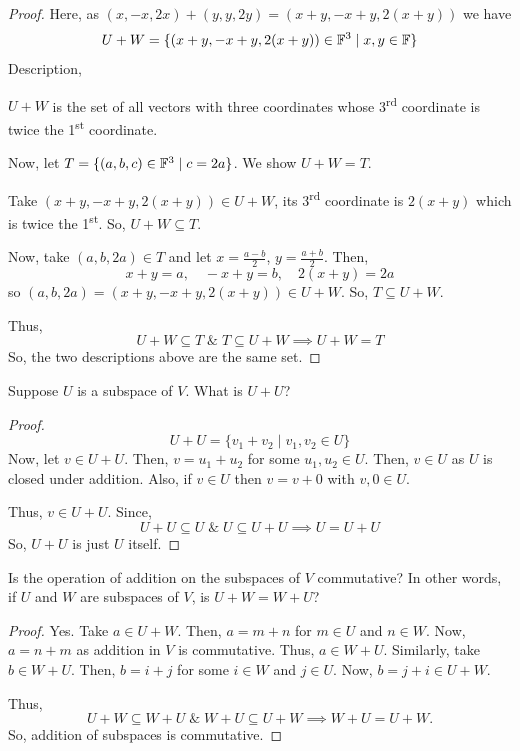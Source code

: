 \begin{proof}
Here, as $(x,-x,2x) + (y,y,2y) = (x+y, -x+y, 2(x+y))$ we have
\[
U + W = \{(x+y, -x+y, 2(x+y)) \in \mathbb{F}^3 \mid x, y \in \mathbb{F}\}
\]
Description,

$U + W$ is the set of all vectors with three coordinates whose 3\textsuperscript{rd} coordinate is twice the 1\textsuperscript{st} coordinate.

Now, let $T = \{(a,b,c) \in \mathbb{F}^3 \mid c = 2a\}$. We show $U + W = T$.

Take $(x+y, -x+y, 2(x+y)) \in U + W$, its 3\textsuperscript{rd} coordinate is $2(x+y)$ which is twice the 1\textsuperscript{st}. So, $U + W \subseteq T$.

Now, take $(a,b,2a) \in T$ and let $x = \frac{a-b}{2}$, $y = \frac{a+b}{2}$. Then,
\[
x + y = a, \quad -x + y = b, \quad 2(x+y) = 2a
\]
so $(a,b,2a) = (x+y, -x+y, 2(x+y)) \in U + W$. So, $T \subseteq U + W$.

Thus,
\[
U + W \subseteq T \;\&\; T \subseteq U + W \implies U + W = T
\]
So, the two descriptions above are the same set.
\end{proof}

\begin{exercise}
Suppose $U$ is a subspace of $V$. What is $U + U$?
\end{exercise}

\begin{proof}
\[
U + U = \{v_1 + v_2 \mid v_1, v_2 \in U\}
\]
Now, let $v \in U + U$. Then, $v = u_1 + u_2$ for some $u_1, u_2 \in U$. Then, $v \in U$ as $U$ is closed under addition. Also, if $v \in U$ then $v = v + 0$ with $v, 0 \in U$.

Thus, $v \in U + U$. Since,
\[
U + U \subseteq U \;\&\; U \subseteq U + U \implies U = U + U
\]
So, $U + U$ is just $U$ itself.
\end{proof}

\begin{exercise}
    \label{ex:1.15}
Is the operation of addition on the subspaces of $V$ commutative? In other words, if $U$ and $W$ are subspaces of $V$, is $U + W = W + U$?
\end{exercise}

\begin{proof}
Yes. Take $a \in U + W$. Then, $a = m + n$ for $m \in U$ and $n \in W$. Now, $a = n + m$ as addition in $V$ is commutative. Thus, $a \in W + U$. Similarly, take $b \in W + U$. Then, $b = i + j$ for some $i \in W$ and $j \in U$. Now, $b = j + i \in U + W$.

Thus,
\[
U + W \subseteq W + U \;\&\; W + U \subseteq U + W \implies W + U = U + W.
\]
So, addition of subspaces is commutative.
\end{proof}

